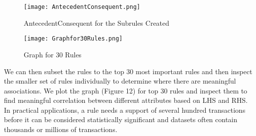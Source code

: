 \documentclass{article}
\begin{document}
 \begin{figure}[h]
    \centering
    \texttt{[image: AntecedentConsequent.png]}
    \caption{AntecedentConsequent for the Subrules Created}
    \label{fig:my_label}
\end{figure}

 \begin{figure}[h]
    \centering
    \texttt{[image: Graphfor30Rules.png]}
    \caption{Graph for 30 Rules}
    \label{fig:my_label}
\end{figure}

We can then subset the rules to the top 30 most important rules and then inspect the smaller set of rules individually to determine where there are meaningful associations. We plot the graph (Figure 12) for top 30 rules and inspect them to find meaningful correlation between different attributes based on LHS and RHS. In practical applications, a rule needs a support of several hundred transactions before it can be considered statistically significant and datasets often contain thousands or millions of transactions.
\end{document}
